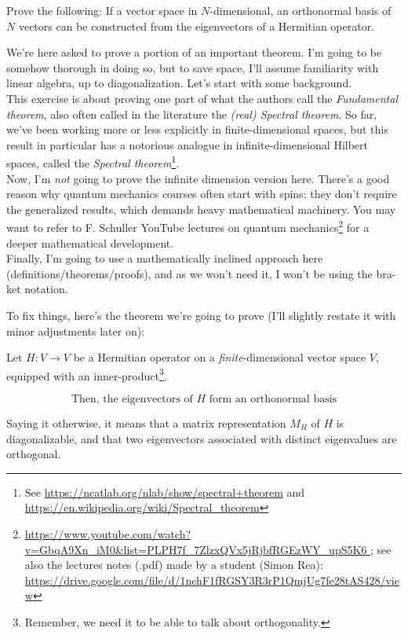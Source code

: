 \documentclass[solutions.tex]{subfiles}
\begin{document}
\maketitle
\begin{exercise}
Prove the following: If a vector space in $N$-dimensional, an
orthonormal basis of $N$ vectors can be constructed from the eigenvectors
of a Hermitian operator.
\end{exercise}

We're here asked to prove a portion of an important theorem. I'm
going to be somehow thorough in doing so, but to save space,
I'll assume familiarity with linear algebra, up to diagonalization.
Let's start with some background. \\

This exercise is about proving one part of what the authors call the
\textit{Fundamental theorem}, also often called in the literature the
\textit{(real) Spectral theorem}. So far, we've been working more or
less explicitly in finite-dimensional spaces, but this result in
particular has a notorious analogue in infinite-dimensional Hilbert
spaces, called the \textit{Spectral theorem}\footnote{See \url{
https://ncatlab.org/nlab/show/spectral+theorem} and \url{
https://en.wikipedia.org/wiki/Spectral_theorem}}. \\

Now, I'm \textit{not} going to prove the infinite dimension
version here. There's a good reason why quantum mechanics courses
often start with spins: they don't require the generalized
results, which demands heavy mathematical machinery.
You may want to refer to F. Schuller YouTube lectures on
quantum mechanics\footnote{\url{
https://www.youtube.com/watch?v=GbqA9Xn_iM0&list=PLPH7f_7ZlzxQVx5jRjbfRGEzWY_upS5K6
}; see also the lectures notes (.pdf) made by a student (Simon Rea):
\url{https://drive.google.com/file/d/1nchF1fRGSY3R3rP1QmjUg7fe28tAS428/view}}
for a deeper mathematical development. \\

Finally, I'm going to use a mathematically inclined approach
here (definitions/theorems/proofs), and as we won't need
it, I won't be using the bra-ket notation.

\hrr

To fix things, here's the theorem we're going to prove (I'll slightly
restate it with minor adjustments later on):

\begin{theorem} Let $H : V \rightarrow V$ be a Hermitian operator on a
\textit{finite}-dimensional vector space $V$, equipped with an
inner-product\footnote{Remember, we need it to be able to talk
about orthogonality.}.

\[
	\boxed{\text{Then, the eigenvectors of $H$ form an orthonormal basis}}
\]

Saying it otherwise, it means that a matrix representation $M_H$ of $H$
is diagonalizable, and that two eigenvectors associated with distinct
eigenvalues are orthogonal.
\end{theorem}
\end{document}
